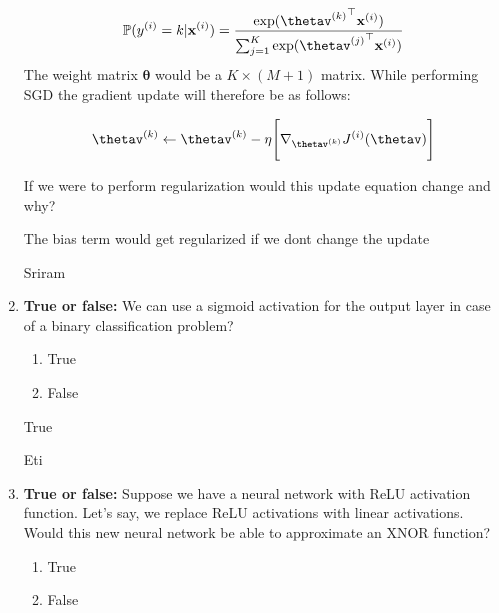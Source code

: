 \begin{enumerate}
 \begin{equation}
   \mathbb P(y^{(i)} = k \vert \mathbf x^{(i)})
    = \frac {\exp({{\mathbf \thetav^{(k)}}^\top \mathbf x^{(i)}})} {\sum_{j=1}^{K} \exp({{\mathbf \thetav^{(j)}}^\top \mathbf x^{(i)}})}
    \label{eq:logreg}
\end{equation}
The weight matrix $\mathbf{\theta}$ would be a $K\times(M+1)$ matrix. While performing SGD the gradient update will therefore be as follows:

\begin{equation}
    \thetav^{(k)} \leftarrow \thetav^{(k)} - \eta  \Bigg[\nabla_{\mathbf \thetav^{(k)}} J^{(i)}(\mathbf \thetav)\Bigg]
\end{equation}

If we were to perform regularization would this update equation change and why?
    \begin{soln}
    The bias term would get regularized if we dont change the update \\
    \end{soln}
    \begin{qauthor}
    Sriram
    \end{qauthor}


    \item \textbf{True or false:} We can use a sigmoid activation for the output layer in case of a binary classification problem?
\begin{enumerate}
\item True
\item False
\end{enumerate}

    \begin{soln}
    True 
    \end{soln}
    
    \begin{qauthor}
    Eti 
    \end{qauthor}
    
    \item \textbf{True or false:} Suppose we have a neural network with ReLU activation function. Let’s say, we replace ReLU activations with linear activations. Would this new neural network be able to approximate an XNOR function?
    
    \begin{enumerate}
    \item True
    \item False
    \end{enumerate}


\end{enumerate}
